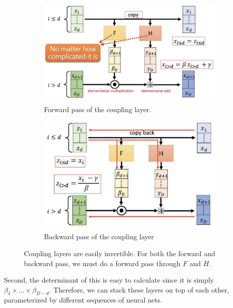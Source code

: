 \documentclass{article}
\begin{document}
    \begin{figure}[H]
      \centering
      \begin{subfigure}[b]{0.48\textwidth}
      \centering
        \includegraphics[width=\textwidth]{img/couple_forward.png}
        \caption{Forward pass of the coupling layer.}
        \label{fig:for}
      \end{subfigure}
      \hfill 
      \begin{subfigure}[b]{0.48\textwidth}
      \centering
        \includegraphics[width=\textwidth]{img/couple_backward.png}
        \caption{Backward pass of the coupling layer}
        \label{fig:back}
      \end{subfigure}
      \caption{Coupling layers are easily invertible. For both the forward and backward pass, we must do a forward pass through $F$ and $H$. }
      \label{fig:coupling_layer}
    \end{figure}

    Second, the determinant of this is easy to calculate since it is simply $\beta_1 \times \ldots \times \beta_{D-d}$. Therefore, we can stack these layers on top of each other, parameterized by different sequences of neural nets. 
\end{document}

